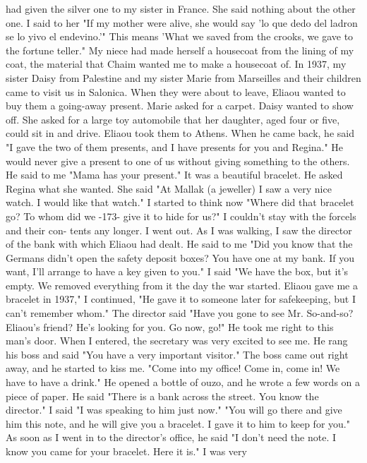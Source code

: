 had given the silver one to my sister in France. She said nothing about 
the other one. I said to her "If my mother were alive, she would say 
'lo que dedo del ladron se lo yivo el endevino.'" This means 'What we 
saved from the crooks, we gave to the fortune teller." 
My niece had made herself a housecoat from the lining of my coat, 
the material that Chaim wanted me to make a housecoat of. 
In 1937, my sister Daisy from Palestine and my sister Marie from 
Marseilles and their children came to visit us in Salonica. When they 
were about to leave, Eliaou wanted to buy them a going-away present. 
Marie asked for a carpet. Daisy wanted to show off. She asked for a 
large toy automobile that her daughter, aged four or five, could sit in 
and drive. Eliaou took them to Athens. When he came back, he said "I 
gave the two of them presents, and I have presents for you and Regina." 
He would never give a present to one of us without giving something to 
the others. He said to me "Mama has your present." It was a beautiful 
bracelet. He asked Regina what she wanted. She said "At Mallak (a jeweller) I saw a very nice watch. I would like that watch." 
I started to think now "Where did that bracelet go? To whom did we
-173- 
give it to hide for us?" I couldn't stay with the forcels and their con-
tents any longer. I went out. As I was walking, I saw the director of 
the bank with which Eliaou had dealt. He said to me "Did you know that 
the Germans didn't open the safety deposit boxes? You have one at my 
bank. If you want, I'll arrange to have a key given to you." I said 
"We have the box, but it's empty. We removed everything from it the day 
the war started. Eliaou gave me a bracelet in 1937," I continued, "He 
gave it to someone later for safekeeping, but I can't remember whom." 
The director said "Have you gone to see Mr. So-and-so? Eliaou's 
friend? He's looking for you. Go now, go!" He took me right to this 
man's door. 
When I entered, the secretary was very excited to see me. He rang 
his boss and said "You have a very important visitor." The boss came out 
right away, and he started to kiss me. "Come into my office! Come in, 
come in! We have to have a drink." He opened a bottle of ouzo, and he 
wrote a few words on a piece of paper. He said "There is a bank across 
the street. You know the director." I said "I was speaking to him just 
now." "You will go there and give him this note, and he will give you 
a bracelet. I gave it to him to keep for you." 
As soon as I went in to the director's office, he said "I don't need 
the note. I know you came for your bracelet. Here it is." I was very 
